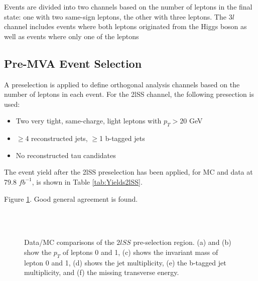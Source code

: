 Events are divided into two channels based on the number of leptons in the final state: one with two same-sign leptons, the other with three leptons. The $3l$ channel includes events where both leptons originated from the Higgs boson as well as events where only one of the leptons 


\subsection{Pre-MVA Event Selection}
\label{subsec:preMVA}

A preselection is applied to define orthogonal analysis channels based on the number of leptons in each event. For the 2lSS channel, the following presection is used:

\begin{itemize}
  \item Two very tight, same-charge, light leptons with $p_T > 20$ GeV
  \item $\geq$4 reconstructed jets, $\geq$1 b-tagged jets
  \item No reconstructed tau candidates
\end{itemize}

The event yield after the 2lSS preselection has been applied, for MC and data at 79.8 $fb^{-1}$, is shown in Table \ref{tab:Yields2lSS}. 



Figure \ref{fig:presel2lSS}. Good general agreement is found.

\begin{figure}[H]
    \centering
    \\
    \\
    \caption{Data/MC comparisons of the $2lSS$ pre-selection region. (a) and (b) show the $p_T$ of leptons 0 and 1, (c) shows the invariant mass of lepton 0 and 1, (d) shows the jet multiplicity, (e) the b-tagged jet multiplicity, and (f) the missing transverse energy.}                           
    \label{fig:presel2lSS}
\end{figure}


